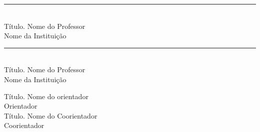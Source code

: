 \begin{folhadeaprovacao}
\begin{flushleft}
		\vspace{18pt}
		
		\rule{7cm}{.1mm} \\
		{Título. Nome do Professor \\ Nome da Instituição} \\ [1.0cm]
		\rule{7cm}{.1mm} \\
		{Título. Nome do Professor \\ Nome da Instituição} \\ [1.0cm]
		
	
	\end{flushleft}
	
	
	\begin{center}
		
		{Título. Nome do orientador \\ Orientador} \\ [1.0cm]
		{Título. Nome do Coorientador \\ Coorientador} \\[.6cm]
		
	\end{center}
	
	\begin{center}
		
		\vspace*{0.5cm}
		
		{\MakeUppercase\imprimirlocal}
		
		\par
		
		{\MakeUppercase\imprimirdata}
		
		\vspace*{1cm}
		
	\end{center}
\end{folhadeaprovacao}

